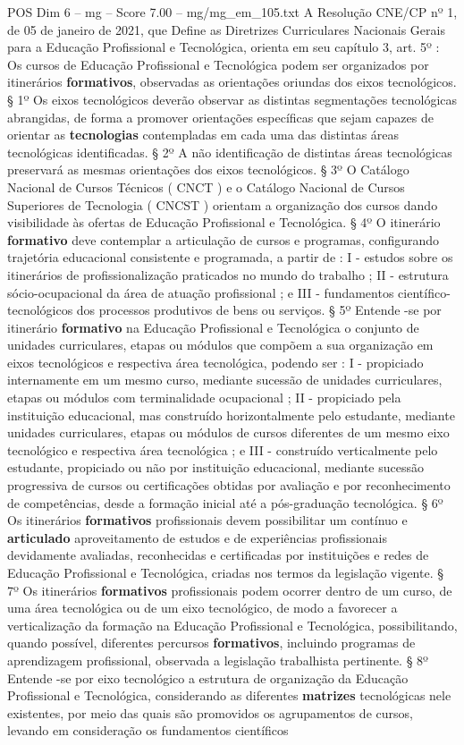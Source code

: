 \begin{textsample}{POS Dim 6 – mg – Score 7.00 – mg/mg\_em\_105.txt}
A Resolução CNE/CP nº 1, de 05 de janeiro de 2021, que Define as Diretrizes Curriculares Nacionais Gerais para a Educação Profissional e Tecnológica, orienta em seu capítulo 3, art. 5º : Os cursos de Educação Profissional e Tecnológica podem ser organizados por itinerários \textbf{formativos}, observadas as orientações oriundas dos eixos tecnológicos. § 1º Os eixos tecnológicos deverão observar as distintas segmentações tecnológicas abrangidas, de forma a promover orientações específicas que sejam capazes de orientar as \textbf{tecnologias} contempladas em cada uma das distintas áreas tecnológicas identificadas. § 2º A não identificação de distintas áreas tecnológicas preservará as mesmas orientações dos eixos tecnológicos. § 3º O Catálogo Nacional de Cursos Técnicos ( CNCT ) e o Catálogo Nacional de Cursos Superiores de Tecnologia ( CNCST ) orientam a organização dos cursos dando visibilidade às ofertas de Educação Profissional e Tecnológica. § 4º O itinerário \textbf{formativo} deve contemplar a articulação de cursos e programas, configurando trajetória educacional consistente e programada, a partir de : I - estudos sobre os itinerários de profissionalização praticados no mundo do trabalho ; II - estrutura sócio-ocupacional da área de atuação profissional ; e III - fundamentos científico-tecnológicos dos processos produtivos de bens ou serviços. § 5º Entende -se por itinerário \textbf{formativo} na Educação Profissional e Tecnológica o conjunto de unidades curriculares, etapas ou módulos que compõem a sua organização em eixos tecnológicos e respectiva área tecnológica, podendo ser : I - propiciado internamente em um mesmo curso, mediante sucessão de unidades curriculares, etapas ou módulos com terminalidade ocupacional ; II - propiciado pela instituição educacional, mas construído horizontalmente pelo estudante, mediante unidades curriculares, etapas ou módulos de cursos diferentes de um mesmo eixo tecnológico e respectiva área tecnológica ; e III - construído verticalmente pelo estudante, propiciado ou não por instituição educacional, mediante sucessão progressiva de cursos ou certificações obtidas por avaliação e por reconhecimento de competências, desde a formação inicial até a pós-graduação tecnológica. § 6º Os itinerários \textbf{formativos} profissionais devem possibilitar um contínuo e \textbf{articulado} aproveitamento de estudos e de experiências profissionais devidamente avaliadas, reconhecidas e certificadas por instituições e redes de Educação Profissional e Tecnológica, criadas nos termos da legislação vigente. § 7º Os itinerários \textbf{formativos} profissionais podem ocorrer dentro de um curso, de uma área tecnológica ou de um eixo tecnológico, de modo a favorecer a verticalização da formação na Educação Profissional e Tecnológica, possibilitando, quando possível, diferentes percursos \textbf{formativos}, incluindo programas de aprendizagem profissional, observada a legislação trabalhista pertinente. § 8º Entende -se por eixo tecnológico a estrutura de organização da Educação Profissional e Tecnológica, considerando as diferentes \textbf{matrizes} tecnológicas nele existentes, por meio das quais são promovidos os agrupamentos de cursos, levando em consideração os fundamentos científicos 
\end{textsample}

